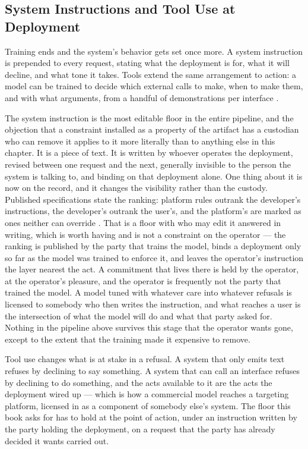 \subsection{System Instructions and Tool Use at Deployment}
\label{sec:4.2.8}
Training ends and the system's behavior gets set once more. A system instruction is prepended to every request, stating what the deployment is for, what it will decline, and what tone it takes. Tools extend the same arrangement to action: a model can be trained to decide which external calls to make, when to make them, and with what arguments, from a handful of demonstrations per interface \autocite{schick2023toolformer}.

The system instruction is the most editable floor in the entire pipeline, and the objection that a constraint installed as a property of the artifact has a custodian who can remove it applies to it more literally than to anything else in this chapter. It is a piece of text. It is written by whoever operates the deployment, revised between one request and the next, generally invisible to the person the system is talking to, and binding on that deployment alone. One thing about it is now on the record, and it changes the visibility rather than the custody. Published specifications state the ranking: platform rules outrank the developer's instructions, the developer's outrank the user's, and the platform's are marked as ones neither can override \autocite{openai2025modelspec}. That is a floor with who may edit it answered in writing, which is worth having and is not a constraint on the operator — the ranking is published by the party that trains the model, binds a deployment only so far as the model was trained to enforce it, and leaves the operator's instruction the layer nearest the act. A commitment that lives there is held by the operator, at the operator's pleasure, and the operator is frequently not the party that trained the model. A model tuned with whatever care into whatever refusals is licensed to somebody who then writes the instruction, and what reaches a user is the intersection of what the model will do and what that party asked for. Nothing in the pipeline above survives this stage that the operator wants gone, except to the extent that the training made it expensive to remove.

Tool use changes what is at stake in a refusal. A system that only emits text refuses by declining to say something. A system that can call an interface refuses by declining to do something, and the acts available to it are the acts the deployment wired up — which is how a commercial model reaches a targeting platform, licensed in as a component of somebody else's system. The floor this book asks for has to hold at the point of action, under an instruction written by the party holding the deployment, on a request that the party has already decided it wants carried out.
